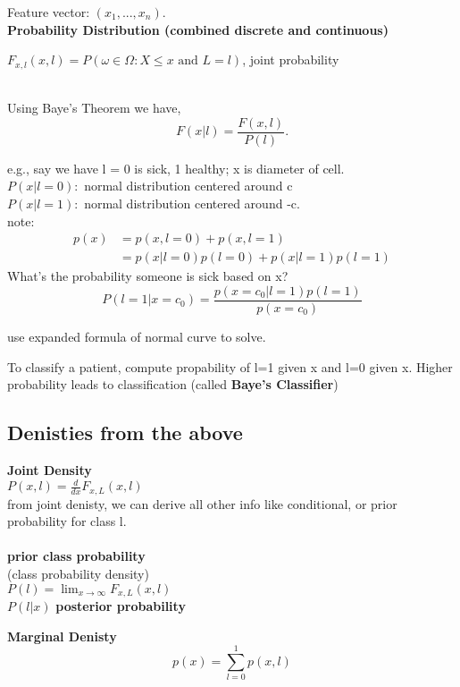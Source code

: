 \documentclass[12pt]{article}
\newcommand{\bt}[1]{\textbf{#1}} %
\begin{document}
Feature vector: $(x_1, ..., x_n)$.\\

\textbf{Probability Distribution (combined discrete and continuous)}\\
\centerline{$F_{x,l}(x, l) = P(\omega \in \Omega : X \leq x \text{ and } L = l)$, joint probability}\\

Using Baye's Theorem we have, 
$$F(x | l) = \frac{F(x, l)}{P(l)}.$$

e.g., say we have l = 0 is sick, 1 healthy; x is diameter of cell.\\
$P(x | l = 0):$ normal distribution centered around c\\
$P(x | l = 1):$ normal distribution centered around -c.\\

note: 
\begin{align*}
p(x) & = p(x, l=0) + p(x, l=1) \\
& = p(x | l=0) p(l=0) + p(x | l=1)p(l=1)
\end{align*}
What's the probability someone is sick based on x?\\

$$P( l = 1 | x = c_0) = \frac{p(x = c_0 | l = 1)p(l = 1)}{p(x=c_0)}$$

use expanded formula of normal curve to solve.

To classify a patient, compute propability of l=1 given x and l=0 given x. Higher probability leads to classification (called \textbf{Baye's Classifier})

\subsection*{Denisties from the above}

\textbf{Joint Density}\\
$P(x, l) = \frac{d}{dx} F_{x, L} (x, l)$\\
from joint denisty, we can derive all other info like conditional, or prior probability for class l.\\
\ \\
\textbf{prior class probability}\\
(class probability density) \\
$P(l) = \lim_{x \rightarrow \infty} F_{x, L} (x, l)$\\


$P(l |x)$ \bt{posterior probability}

\textbf{Marginal Denisty }
$$p(x) = \sum_{l=0}^1 p(x, l)$$
\end{document}
